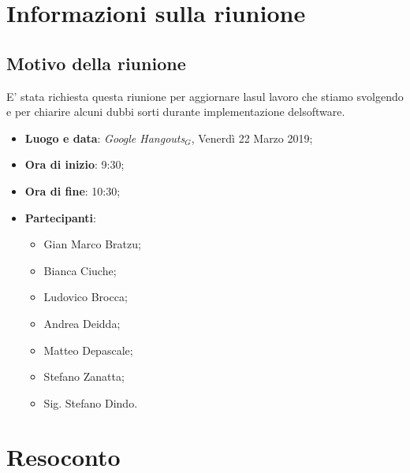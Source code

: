 \documentclass[a4paper,12pt]{article}
\begin{document}
	\tableofcontents
	\cleardoublepage
	\section{Informazioni sulla riunione}
	\subsection{Motivo della riunione}E' stata richiesta questa riunione per aggiornare lasul lavoro che stiamo svolgendo e per chiarire alcuni dubbi sorti durante implementazione delsoftware.
	
	\begin{itemize}
		\item \textbf{Luogo e data}: \textit{Google Hangouts$_{G}$}, Venerdì 22 Marzo 2019;
		\item \textbf{Ora di inizio}: 9:30;
		\item \textbf{Ora di fine}: 10:30;
		\item \textbf{Partecipanti}:  
		\begin{itemize}
			\item Gian Marco Bratzu;
			\item Bianca Ciuche;
			\item Ludovico Brocca;
			\item Andrea Deidda;
			\item Matteo Depascale;
			\item Stefano Zanatta;
			\item Sig. Stefano Dindo.
		\end{itemize}
	\end{itemize}
	
	\section{Resoconto}
\end{document}

